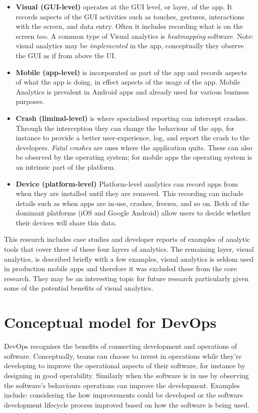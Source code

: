 \begin{itemize}
    \item \textbf{Visual (GUI-level)} operates at the GUI level, or layer, of the app. It records aspects of the GUI activities such as touches, gestures, interactions with the screen, and data entry. Often it includes recording what is on the screen too. A common type of Visual analytics is \emph{heatmapping} software. Note: visual analytics may be \emph{implemented} in the app, conceptually they observe the GUI as if from above the UI.
    \item \textbf{Mobile (app-level)} is incorporated as part of the app and records aspects of what the app is doing, in effect aspects of the usage of the app. Mobile Analytics is prevalent in Android apps and already used for various business purposes.
    \item \textbf{Crash (liminal-level)} is where specialised reporting can intercept crashes. Through the interception they can change the behaviour of the app, for instance to provide a better user-experience, log, and report the crash to the developers. \emph{Fatal crashes} are ones where the application quits. These can also be observed by the operating system; for mobile apps the operating system is an intrinsic part of the platform.
    \item \textbf{Device (platform-level)} Platform-level analytics can record apps from when they are installed until they are removed. This recording can include details such as when apps are in-use, crashes, freezes, and so on. Both of the dominant platforms (iOS and Google Android) allow users to decide whether their devices will share this data.
\end{itemize}


This research includes case studies and developer reports of examples of analytic tools that cover three of these four layers of analytics. The remaining layer, visual analytics, is described briefly with a few examples, visual analytics is seldom used in production mobile apps and therefore it was excluded these from the core research. They may be an interesting topic for future research particularly given some of the potential benefits of visual analytics. %


\section{Conceptual model for DevOps}
DevOps recognises the benefits of connecting development and operations of software. Conceptually, teams can choose to invest in operations while they're developing to improve the operational aspects of their software, for instance by designing in good operability. Similarly when the software is in use by observing the software's behaviours operations can improve the development. Examples include: considering the how improvements could be developed or the software development lifecycle process improved based on how the software is being used.

